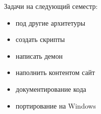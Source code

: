 Задачи на следующий семестр:
\begin{itemize}
  \item под другие архитетуры
  \item создать скрипты 
  \item написать демон
  \item наполнить контентом сайт
  \item документирование кода
  \item портирование на Windows
\end{itemize}
